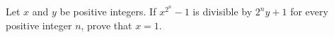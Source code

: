 Let 
$x$
 and 
$y$
 be positive integers. If 
${x^{2^n}}-1$
 is divisible by 
$2^ny+1$
 for every positive integer 
$n$, 
 prove that 
$x=1$.
